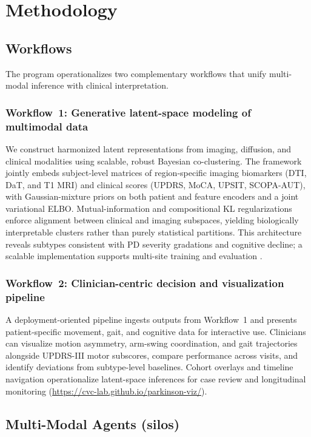 \documentclass[11pt]{article}
\begin{document}
\section{Methodology}
\label{sec:methodology}

\subsection{Workflows}

The program operationalizes two complementary workflows that unify multi-modal inference with clinical interpretation. 

\subsubsection{Workflow~1: Generative latent-space modeling of multimodal data}
We construct harmonized latent representations from imaging, diffusion, and clinical modalities using scalable, robust Bayesian co-clustering. The framework jointly embeds subject-level matrices of region-specific imaging biomarkers (DTI, DaT, and T1 MRI) and clinical scores (UPDRS, MoCA, UPSIT, SCOPA-AUT), with Gaussian-mixture priors on both patient and feature encoders and a joint variational ELBO. Mutual-information and compositional KL regularizations enforce alignment between clinical and imaging subspaces, yielding biologically interpretable clusters rather than purely statistical partitions. This architecture reveals subtypes consistent with PD severity gradations and cognitive decline; a scalable implementation supports multi-site training and evaluation \cite{vinod2025compositional,vinod2025scalable}.

\subsubsection{Workflow~2: Clinician-centric decision and visualization pipeline}
A deployment-oriented pipeline ingests outputs from Workflow~1 and presents patient-specific movement, gait, and cognitive data for interactive use. Clinicians can visualize motion asymmetry, arm-swing coordination, and gait trajectories alongside UPDRS-III motor subscores, compare performance across visits, and identify deviations from subtype-level baselines. Cohort overlays and timeline navigation operationalize latent-space inferences for case review and longitudinal monitoring (\url{https://cvc-lab.github.io/parkinson-viz/}).

\subsection{Multi-Modal Agents (silos)}
\end{document}
